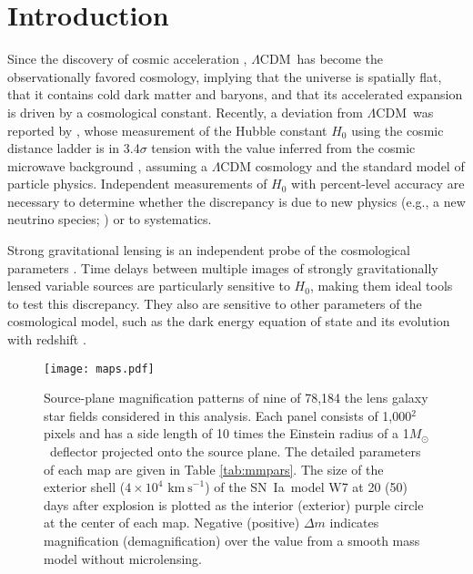 \documentclass[iop,apj,numberedappendix,twocolappendix]{emulateapj}
\newcommand{\snia}{{\rm SN~Ia}}
\newcommand{\msun}{{\ensuremath{M_{\odot}}}}
\newcommand{\kms}{\ensuremath{\mathrm{km~s}^{-1}}}
\newcommand{\lcdm}{\ensuremath{\Lambda}CDM}
\begin{document}

\section{Introduction}
\label{sec:intro}

Since the discovery of cosmic acceleration \citep{adam,saul}, \lcdm\ has become the observationally favored cosmology, implying that the universe is spatially flat, that it contains cold dark matter and baryons, and that its accelerated expansion is driven by a cosmological constant. 
Recently, a deviation from \lcdm\ was reported by \cite{riess16}, whose measurement of the Hubble constant $H_0$ using the cosmic distance ladder is in 3.4$\sigma$ tension with the value inferred from the cosmic microwave background \citep[CMB;][]{planck15}, assuming a $\Lambda$CDM cosmology and the standard model of particle physics.
Independent measurements of $H_0$ with percent-level accuracy are necessary to determine whether the discrepancy is due to new physics (e.g., a new neutrino species; \citealt{riess16,bonvin17}) or to systematics.

Strong gravitational lensing is an independent probe of the cosmological parameters \citep{oguri12,suyu13,collett14}. 
Time delays between multiple images of strongly gravitationally lensed variable sources are particularly sensitive to $H_0$, making them ideal tools to test this discrepancy.
They also are sensitive to other parameters of the cosmological model, such as the dark energy equation of state and its evolution with redshift \citep{linder04,linder11,cosmography}.

\begin{figure*}
	\centering
    \texttt{[image: maps.pdf]}
    \caption{Source-plane magnification patterns of nine of 78,184 the lens galaxy star fields considered in this analysis.
    Each panel consists of 1,000$^2$ pixels and has a side length of 10 times the Einstein radius of a 1\msun\ deflector projected onto the source plane.
    The detailed parameters of each map are given in Table \ref{tab:mmpars}.
    The size of the exterior shell ($4 \times 10^4$ \kms) of the \snia\ model W7 at 20 (50) days after explosion is plotted as the interior (exterior) purple circle at the center of each map.
	Negative (positive) $\Delta m$ indicates magnification (demagnification) over the value from a smooth mass model without microlensing.
}
    \label{fig:mmap}
\end{figure*}
\end{document}
